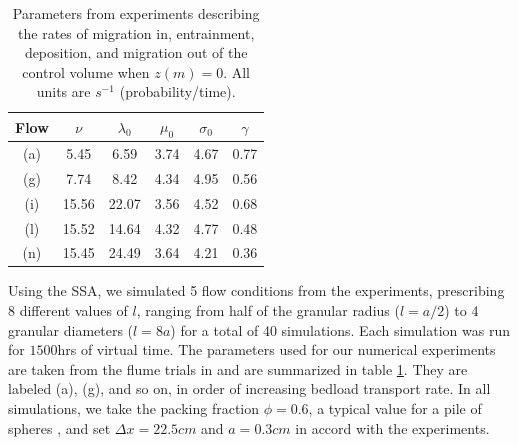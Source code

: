 \documentclass[draft]{agujournal2018}
\begin{document}
\begin{table}
\caption{Parameters from \citet{Ancey2008} experiments describing the rates of migration in, entrainment, deposition, and migration out of the control volume when $z(m)=0$. All units are $s^{-1}$ (probability/time).}\label{tab:anceyparams}
\begin{tabular}{cccccc} \\ 
\toprule  
Flow & $\nu$ & $\lambda_0$ & $\mu_0$ & $\sigma_0$ & $\gamma$ \\
\midrule
(a) & 5.45  & 6.59  & 3.74 & 4.67 & 0.77 \\
\midrule
(g) & 7.74  & 8.42  & 4.34 & 4.95 & 0.56 \\
\midrule
(i) & 15.56 & 22.07 & 3.56 & 4.52 & 0.68 \\
\midrule
(l) & 15.52 & 14.64 & 4.32 & 4.77 & 0.48 \\
\midrule
(n) & 15.45 & 24.49 & 3.64 & 4.21 & 0.36 \\
\bottomrule
\end{tabular}
\end{table} 
Using the SSA, we simulated 5 flow conditions from the \citet{Ancey2008} experiments, prescribing 8 different values of $l$, ranging from half of the granular radius ($l=a/2$) to 4 granular diameters ($l=8a$) for a total of 40 simulations.
Each simulation was run for $1500$hrs of virtual time.
The parameters used for our numerical experiments are taken from the flume trials in \citet{Ancey2008} and are summarized in table \ref{tab:anceyparams}.
They are labeled (a), (g), and so on, in order of increasing bedload transport rate. 
In all simulations, we take the packing fraction $\phi = 0.6$, a typical value for a pile of spheres \citep{Bennett1972}, and set $\Delta x = 22.5cm$ and $a = 0.3 cm$ in accord with the \citet{Ancey2008} experiments.











\end{document}
